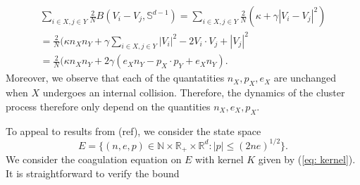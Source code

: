 \begin{multline*}
    \sum_{i\in X, j\in Y} \frac{2}{N}B(V_i-V_j, \mathbb{S}^{d-1})=\sum_{i\in X, j\in Y} \frac{2}{N}(\kappa+\gamma|V_i-V_j|^2) \\ = \frac{2}{N}(\kappa n_Xn_{Y}+\gamma\sum_{i\in X, j\in Y} |V_i|^2-2V_i\cdot V_j+|V_j|^2 \\= \frac{2}{N}(\kappa n_Xn_{Y} +2\gamma(e_{X}n_{Y}-p_X\cdot p_{Y}+e_{X}n_{Y}).
\end{multline*} Moreover, we observe that each of the quantatities $n_X, p_X, e_X$ are unchanged when $X$ undergoes an internal collision. Therefore, the dynamics of the cluster process therefore only depend on the quantities $n_X, e_X, p_X.$

To appeal to results from (ref), we consider the state space $$E=\{(n,e,p)\in\mathbb{N}\times \mathbb{R}_+\times \mathbb{R}^d: |p|\leq(2ne)^{1/2}\}.$$We consider the coagulation equation on $E$ with kernel $K$ given by (\ref{eq: kernel}). It is straightforward to verify the bound 
